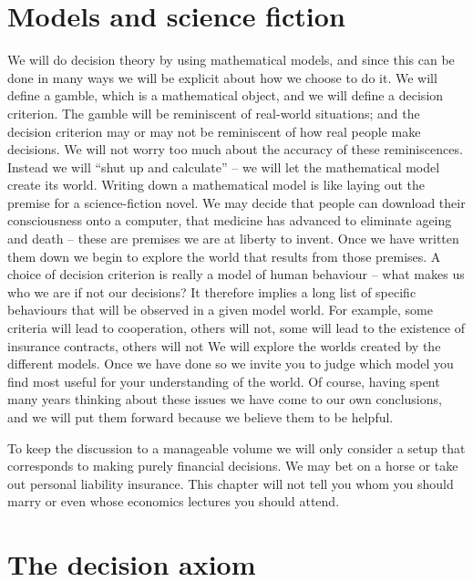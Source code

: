 \section{Models and science fiction}
We will do decision theory 
by using mathematical models, and since this can be done in many ways we will be
explicit about how we choose to do it. We will define a gamble, which 
is a mathematical object, and we will define a decision criterion. The gamble will be
reminiscent of real-world situations; and the decision criterion may or may not be reminiscent
of how real people make decisions. We will not worry too much about the accuracy 
of these reminiscences. Instead we will ``shut up and calculate'' -- we will let the mathematical
model create its world. Writing down a mathematical model is like laying out the premise for
a science-fiction novel. We may decide that people can download their consciousness onto a computer, 
that medicine has advanced to eliminate ageing and death -- these are premises we are at liberty to invent.
Once we have written them down we begin to explore the world that results from those premises.
A choice of decision criterion is really a model of human behaviour -- what makes us who we are if not our decisions? It therefore implies a long list of specific behaviours that will
be observed in a given model world. For example, some criteria will lead to cooperation, others will not, some will lead
to the existence of insurance contracts, others will not \etc We will explore the worlds created by the different
models. Once we have done so we invite you to judge which model you find most useful
for your understanding of the world. Of course, having spent many years thinking about these
issues we have come to our own conclusions, and we will put them forward because we believe them to be helpful.

To keep the discussion to a manageable volume we will only consider a setup that corresponds to
making purely financial decisions. We may bet on a horse or take out personal liability insurance.
This chapter will not tell you whom you should marry or even whose economics lectures you should attend.


\section{The decision axiom}

